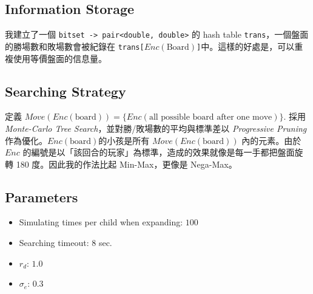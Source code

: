 \documentclass[12pt,a4paper]{article}
\begin{document}
    \subsection{Information Storage}
        我建立了一個 \texttt{bitset -> pair<double, double>} 的 hash table \texttt{trans}，一個盤面的勝場數和敗場數會被紀錄在 \texttt{trans[}\(Enc(\text{Board})\)\texttt{]}中。這樣的好處是，可以重複使用等價盤面的信息量。
    \subsection{Searching Strategy}
        定義 \(Move(Enc(\text{board}))=\{Enc(\text{all possible board after one move})\}\).
        採用 \textit{Monte-Carlo Tree Search}，並對勝/敗場數的平均與標準差以 \textit{Progressive Pruning} 作為優化。\(Enc(\text{board})\)的小孩是所有 \(Move(Enc(\text{board}))\) 內的元素。由於 \(Enc\) 的編號是以「該回合的玩家」為標準，造成的效果就像是每一手都把盤面旋轉 180 度。因此我的作法比起 Min-Max，更像是 Nega-Max。
    \subsection{Parameters}
    \begin{itemize}
        \item Simulating times per child when expanding: \(100\)
        \item Searching timeout: \(8\) sec.
        \item \(r_d\): \(1.0\)
        \item \(\sigma_e\): \(0.3\)
    \end{itemize}
\end{document}

